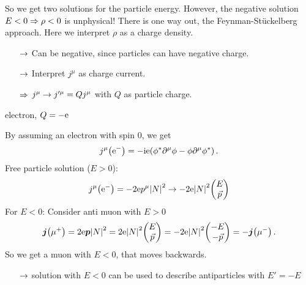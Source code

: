 So we get two solutions for the particle energy. However, the negative solution $E < 0 \Rightarrow \rho < 0$ is unphysical! There is one way out, the Feynman-Stückelberg approach. Here we interpret $\rho$ as a charge density.
\begin{itemize}
    \item[$\rightarrow$] Can be negative, since particles can have negative charge.
    \item[$\rightarrow$] Interpret $j^\mu$ as charge current.
    \item[$\Rightarrow$] $j^\mu \rightarrow j'^\mu = Q j^\mu$ with $Q$ as particle charge.
\end{itemize}

\begin{example}
    electron, $ Q= -\mathrm{e}$
    
    By assuming an electron with spin 0, we get
    \begin{align}
        j^\mu \qty(\mathrm{e}^-) = - \mathrm{i} \mathrm{e} \qty(\phi^* \partial^\mu \phi - \phi \partial^\mu \phi^*)\,.
    \end{align}
    Free particle solution ($E>0$):
    \begin{align}
        j^\mu \qty(\mr e^-) = -2 \mr e p^\mu \qty|N|^2 \ra - 2 \mr e \qty|N|^2 \mqty(E \\ \vec p)
    \end{align}
    For $E<0$: Consider anti muon with $E>0$
    \begin{align}
        \fvec j \qty(\mu^+) = 2 \mr e \fvec p \qty|N|^2 = 2 \mr e \qty|N|^2 \mqty(E \\ \vec p) = - 2 \mr e \qty|N|^2 \mqty(-E \\ -\vec p)  = - \fvec j \qty(\mu^-)\,.
    \end{align}
    So we get a muon with $E<0$, that moves backwards.
\end{example}
\begin{itemize}
    \item[$\rightarrow$] solution with $E<0$ can be used to describe antiparticles with $E' = -E$
\end{itemize}
